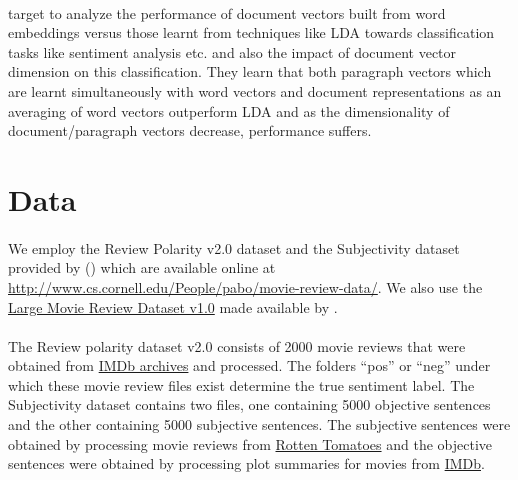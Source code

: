 \documentclass[a4paper,26pt]{article}
\begin{document}
\paragraph{}
\cite{dai2015document} target to analyze the performance of document vectors built from word embeddings versus those learnt from techniques like LDA towards classification tasks like sentiment analysis etc. and also the impact of document vector dimension on this classification. They learn that both paragraph vectors which are learnt simultaneously with word vectors and document representations as an averaging of word vectors outperform LDA and as the dimensionality of document/paragraph vectors decrease, performance suffers.

\section{Data}

\paragraph{}

We employ the Review Polarity v2.0 dataset and the Subjectivity dataset provided by (\cite{pang2004sentimental}) which are available online at \url{http://www.cs.cornell.edu/People/pabo/movie-review-data/}. We also use the \href{http://ai.stanford.edu/~amaas/data/sentiment/}{Large Movie Review Dataset v1.0} made available by \cite{maas2011learning}. 

\paragraph{}

The Review polarity dataset v2.0 consists of 2000 movie reviews that were obtained from \href{http://reviews.imdb.com/Reviews}{IMDb archives} and processed. The folders ``pos'' or ``neg'' under which these movie review files exist determine the true sentiment label. The Subjectivity dataset contains two files, one containing 5000 objective sentences and the other containing 5000 subjective sentences. The subjective sentences were obtained by processing movie reviews from \href{http://www.rottentomatoes.com/}{Rotten Tomatoes} and the objective sentences were obtained by processing plot summaries for movies from \href{http://www.imdb.com}{IMDb}.

\paragraph{} 
\end{document}

